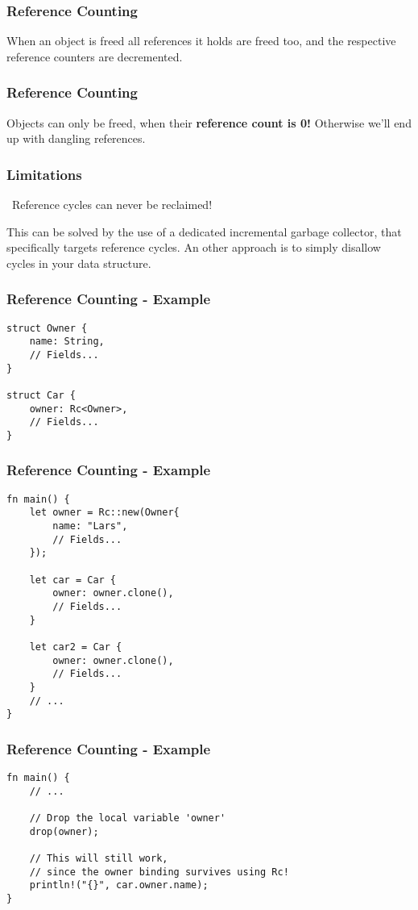 \documentclass{beamer}
\newcommand{\attention}{{\scalebox{.75}{\bf}}\ }
\begin{document}
\begin{frame}
	\frametitle{Reference Counting}
	When an object is freed all references it holds are freed too, and the respective reference counters are decremented.
	\begin{figure}
		\def\svgwidth{120pt}
		\LARGE
		
	\end{figure}
\end{frame}
\begin{frame}
	\frametitle{Reference Counting}
	Objects can only be freed, when their \textbf{reference count is 0!} Otherwise we'll end up with dangling references.
	\begin{figure}
		\def\svgwidth{120pt}
		\LARGE
		
	\end{figure}
\end{frame}
\begin{frame}
	\frametitle{Limitations}
	\attention Reference cycles can never be reclaimed!
	\begin{figure}
		\def\svgwidth{100pt}
		
	\end{figure}
	This can be solved by the use of a dedicated incremental garbage collector, that specifically targets reference cycles.
	An other approach is to simply disallow cycles in your data structure.
\end{frame}
\begin{frame}[fragile]
	\frametitle{Reference Counting - Example}
	\begin{verbatim}
struct Owner {
	name: String,
	// Fields...
}	

struct Car {
	owner: Rc<Owner>,
	// Fields...
}
	\end{verbatim}
\end{frame}
\begin{frame}[fragile]
	\frametitle{Reference Counting - Example}
	\begin{verbatim}
fn main() {
	let owner = Rc::new(Owner{
		name: "Lars",
		// Fields...
	});

	let car = Car {
		owner: owner.clone(),
		// Fields...
	}

	let car2 = Car {
		owner: owner.clone(),
		// Fields...
	}
	// ...
}
	\end{verbatim}
\end{frame}
\begin{frame}[fragile]
	\frametitle{Reference Counting - Example}
	\begin{verbatim}
fn main() {
	// ...

	// Drop the local variable 'owner'
	drop(owner);

	// This will still work, 
	// since the owner binding survives using Rc!
	println!("{}", car.owner.name);
}
	\end{verbatim}
\end{frame}
\end{document}
